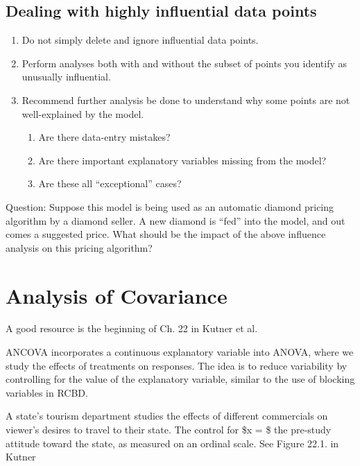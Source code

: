 \documentclass[
]{book}
\providecommand{\tightlist}{%
  \setlength{\itemsep}{0pt}\setlength{\parskip}{0pt}}
\begin{document}
\hypertarget{dealing-with-highly-influential-data-points}{%
\section{Dealing with highly influential data points}\label{dealing-with-highly-influential-data-points}}

\begin{enumerate}
\def\labelenumi{\arabic{enumi}.}
\tightlist
\item
  Do not simply delete and ignore influential data points.
\item
  Perform analyses both with and without the subset of points you identify as unusually influential.
\item
  Recommend further analysis be done to understand why some points are not well-explained by the model.

  \begin{enumerate}
  \def\labelenumii{\alph{enumii}.}
  \tightlist
  \item
    Are there data-entry mistakes?
  \item
    Are there important explanatory variables missing from the model?
  \item
    Are these all ``exceptional'' cases?
  \end{enumerate}
\end{enumerate}

Question: Suppose this model is being used as an automatic diamond pricing algorithm by a diamond seller. A new diamond is ``fed'' into the model, and out comes a suggested price. What should be the impact of the above influence analysis on this pricing algorithm?

\hypertarget{analysis-of-covariance}{%
\chapter{Analysis of Covariance}\label{analysis-of-covariance}}

A good resource is the beginning of Ch. 22 in Kutner et al.

ANCOVA incorporates a continuous explanatory variable into ANOVA, where we study the effects of treatments on responses. The idea is to reduce variability by controlling for the value of the explanatory variable, similar to the use of blocking variables in RCBD.

A state's tourism department studies the effects of different commercials on viewer's desires to travel to their state. The control for \$x = \$ the pre-study attitude toward the state, as measured on an ordinal scale. See Figure 22.1. in Kutner
\end{document}
